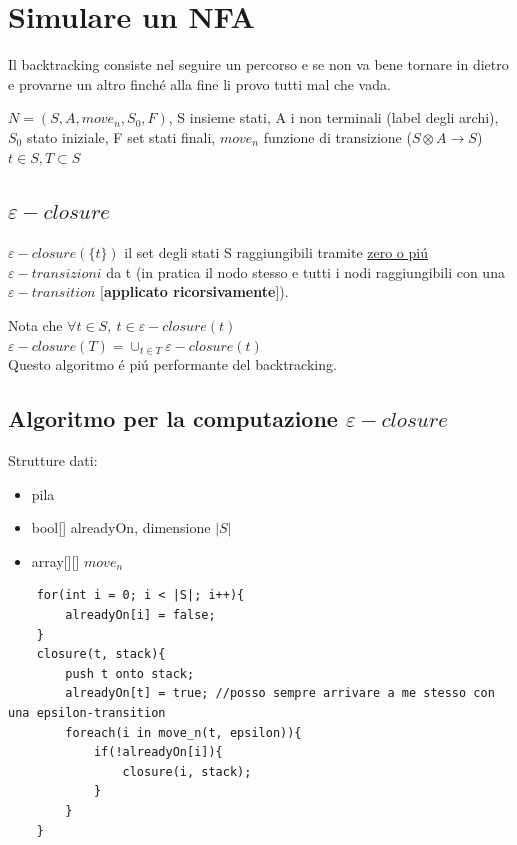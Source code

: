 \section{Simulare un NFA}
Il backtracking consiste nel seguire un percorso e se non va bene tornare in dietro e provarne un altro finch\'e alla fine 
li provo tutti mal che vada.

$N=(S,A,move_n,S_0,F)$, S insieme stati, A i non terminali (label degli archi), $S_0$ stato iniziale, F set stati finali, 
$move_n$ funzione di transizione ($S \otimes A \rightarrow S$)\\
$t \in S, T \subset S$\\

\subsection{$\varepsilon -closure$}

\begin{tcolorbox}\begin{center}
    $\varepsilon - closure(\{ t \})$ il set degli stati S raggiungibili tramite \underline{zero o pi\'u} 
    $\varepsilon -transizioni$ da t (in pratica il nodo stesso e tutti i nodi raggiungibili con una $\varepsilon-transition$
    [\textbf{applicato ricorsivamente}]).
\end{center}\end{tcolorbox}

Nota che $\forall t \in S,\ t\in \varepsilon-closure(t) \qquad$ $\varepsilon-closure(T) = \cup _{t \in T} \varepsilon-closure(t)$\\

Questo algoritmo \'e pi\'u performante del backtracking.

\subsection{Algoritmo per la computazione $\varepsilon -closure$}
Strutture dati:
\begin{itemize}
    \item pila\\
    \item bool[] alreadyOn, dimensione $|S|$\\
    \item array[][] $move_n$\\ 
\end{itemize}
\begin{lstlisting}
    for(int i = 0; i < |S|; i++){
        alreadyOn[i] = false;
    }
    closure(t, stack){
        push t onto stack;
        alreadyOn[t] = true; //posso sempre arrivare a me stesso con una epsilon-transition 
        foreach(i in move_n(t, epsilon)){
            if(!alreadyOn[i]){
                closure(i, stack);
            }
        }
    }
\end{lstlisting}

